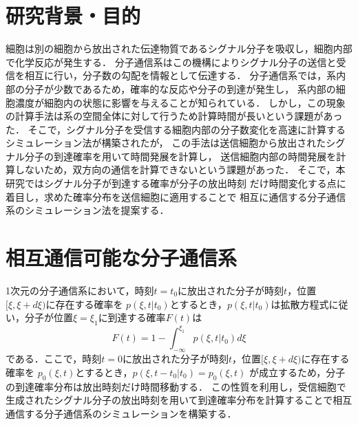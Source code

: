 \documentclass[twocolumn]{jarticle}
\begin{document}
\maketitle

\section{研究背景・目的}
細胞は別の細胞から放出された伝達物質であるシグナル分子を吸収し，細胞内部で化学反応が発生する．
分子通信系はこの機構によりシグナル分子の送信と受信を相互に行い，分子数の勾配を情報として伝達する．
分子通信系では，系内部の分子が少数であるため，確率的な反応や分子の到達が発生し，
系内部の細胞濃度が細胞内の状態に影響を与えることが知られている\cite{Yamagishi}．
しかし，この現象の計算手法は系の空間全体に対して行うため計算時間が長いという課題があった．
そこで，シグナル分子を受信する細胞内部の分子数変化を高速に計算するシミュレーション法\cite{hara}が構築されたが，
この手法は送信細胞から放出されたシグナル分子の到達確率を用いて時間発展を計算し，
送信細胞内部の時間発展を計算しないため，双方向の通信を計算できないという課題があった．
そこで，本研究ではシグナル分子が到達する確率が分子の放出時刻
だけ時間変化する点に着目し，求めた確率分布を送信細胞に適用することで
相互に通信する分子通信系のシミュレーション法を提案する．

\section{相互通信可能な分子通信系}
1次元の分子通信系において，時刻$t=t_0$に放出された分子が時刻$t$，位置$[\xi,\xi+d\xi)$に存在する確率を
$p(\xi,t|t_0)$とするとき，$p(\xi,t|t_0)$は拡散方程式に従い，分子が位置$\xi =\xi_1$に到達する確率$F(t)$は
\begin{equation}
    F(t) = 1- \int_{-\infty}^{\xi_1} p(\xi,t|t_0)d\xi
\end{equation}
である．ここで，時刻$t=0$に放出された分子が時刻$t$，位置$[\xi,\xi+d\xi)$に存在する確率を
$p_0(\xi,t)$とするとき，$p(\xi,t-t_0|t_0)=$$p_0(\xi,t)$
が成立するため，分子の到達確率分布は放出時刻だけ時間移動する．
この性質を利用し，受信細胞で生成されたシグナル分子の放出時刻を用いて到達確率分布を計算することで相互通信する分子通信系のシミュレーションを構築する．
\end{document}
